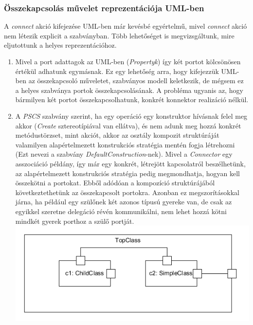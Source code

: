 \documentclass[a4paper,12pt]{report}
\begin{document}
\subsubsection{Összekapcsolás művelet reprezentációja UML-ben}
A \textit{connect} akció kifejezése UML-ben már kevésbé egyértelmű, mivel \textit{connect} akció nem létezik explicit a szabványban. Több lehetőséget is megvizsgáltunk, mire eljutottunk a helyes reprezentációhoz.
\begin{enumerate}
\item Mivel a port adattagok az UML-ben (\textit{Propertyk}) így két portot kölcsönösen értékül adhatunk egymásnak. Ez egy lehetőség arra, hogy kifejezzük UML-ben az összekapcsoló műveletet, szabványos modell keletkezik, de mégsem ez a helyes szabványa portok összekapcsolásának. A probléma ugyanis az, hogy bármilyen két portot összekapcsolhatunk, konkrét konnektor realizáció nélkül.
\item A \textit{PSCS} szabvány szerint, ha egy operáció egy konstruktor hívásnak felel meg akkor (\textit{Create} sztereotípiával van ellátva), és nem adunk meg hozzá konkrét metódustörzset, mint akciót, akkor az osztály kompozit struktúráját valamilyen alapértelmezett konstrukciós stratégia mentén fogja létrehozni (Ezt nevezi a szabvány \textit{DefaultConstruction}-nek). Mivel a \textit{Connector} egy asszociáció példány, így már egy konkrét, létrejött kapcsolatról beszélhetünk, az alapértelmezett konstrukciós stratégia pedig megmondhatja, hogyan kell összekötni a portokat. Ebből adódóan a kompozíció struktúrájából következtethetünk az összekapcsolt portokra. Azonban ez megszorításokkal járna, ha például egy szülőnek két azonos típusú gyereke van, de csak az egyikkel szeretne delegáció révén kommunikálni, nem lehet hozzá kötni mindkét gyerek porthoz a szülő portját.  \\
\includegraphics[scale=0.8]{preconnect_problem.png}

\end{enumerate}
\end{document}
